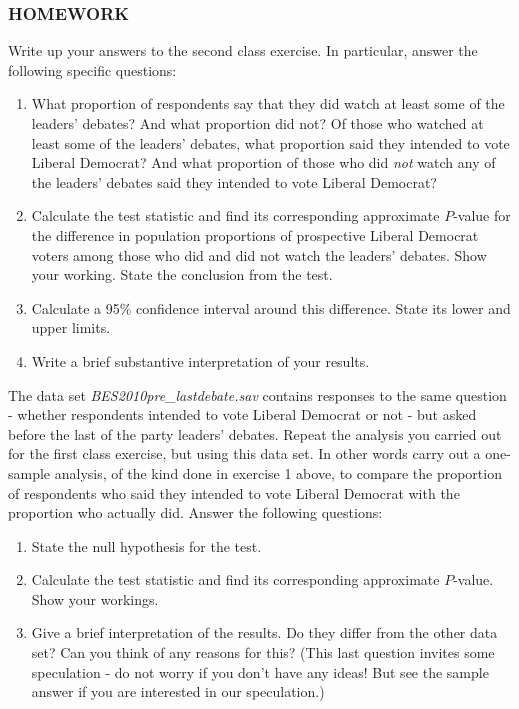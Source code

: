 \documentclass[11pt,a4paper,openany]{book}
\begin{document}
\subsubsection*{HOMEWORK}\label{homework-3}

Write up your answers to the second class exercise. In particular,
answer the following specific questions:

\begin{enumerate}
\def\labelenumi{\arabic{enumi}.}
\item
  What proportion of respondents say that they did watch at least some
  of the leaders' debates? And what proportion did not? Of those who
  watched at least some of the leaders' debates, what proportion said
  they intended to vote Liberal Democrat? And what proportion of those
  who did \emph{not} watch any of the leaders' debates said they
  intended to vote Liberal Democrat?
\item
  Calculate the test statistic and find its corresponding approximate
  \(P\)-value for the difference in population proportions of
  prospective Liberal Democrat voters among those who did and did not
  watch the leaders' debates. Show your working. State the conclusion
  from the test.
\item
  Calculate a 95\% confidence interval around this difference. State its
  lower and upper limits.
\item
  Write a brief substantive interpretation of your results.
\end{enumerate}

The data set \emph{BES2010pre\_lastdebate.sav} contains responses to the
same question - whether respondents intended to vote Liberal Democrat or
not - but asked before the last of the party leaders' debates. Repeat
the analysis you carried out for the first class exercise, but using
this data set. In other words carry out a one-sample analysis, of the
kind done in exercise 1 above, to compare the proportion of respondents
who said they intended to vote Liberal Democrat with the proportion who
actually did. Answer the following questions:

\begin{enumerate}
\def\labelenumi{\arabic{enumi}.}
\item
  State the null hypothesis for the test.
\item
  Calculate the test statistic and find its corresponding approximate
  \(P\)-value. Show your workings.
\item
  Give a brief interpretation of the results. Do they differ from the
  other data set? Can you think of any reasons for this? (This last
  question invites some speculation - do not worry if you don't have any
  ideas! But see the sample answer if you are interested in our
  speculation.)
\end{enumerate}
\end{document}
